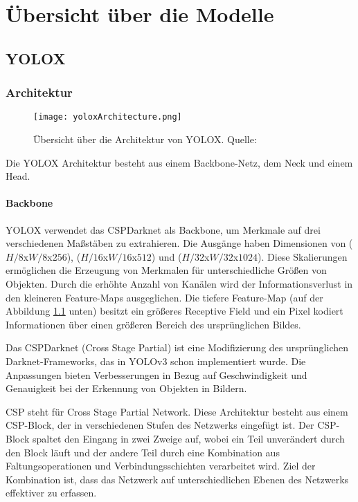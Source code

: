 \chapter{Übersicht über die Modelle}
\section{YOLOX}\label{chap:yolox}
\subsection{Architektur}

\begin{figure}[h]
	\centering
	\texttt{[image: yoloxArchitecture.png]}
	\caption[Übersicht über die Architektur von YOLOX]{Übersicht über die Architektur von YOLOX. Quelle: \cite{yoloArchitecture, yoloxPaper, yoloxGitHubRepo}}
	\label{fig:yoloxArchitecture.png}
\end{figure}

Die YOLOX Architektur besteht aus einem Backbone-Netz, dem Neck und einem Head.

\subsubsection{Backbone}
YOLOX verwendet das CSPDarknet als Backbone, um Merkmale auf drei verschiedenen Maßstäben zu extrahieren. Die Ausgänge haben Dimensionen von ($H/8$x$W/8$x$256$), ($H/16$x$W/16$x$512$) und ($H/32$x$W/32$x$1024$). Diese Skalierungen ermöglichen die Erzeugung von Merkmalen für unterschiedliche Größen von Objekten. Durch die erhöhte Anzahl von Kanälen wird der Informationsverlust in den kleineren Feature-Maps ausgeglichen. Die tiefere Feature-Map (auf der Abbildung \ref{fig:yoloxArchitecture.png} unten) besitzt ein größeres Receptive Field und ein Pixel kodiert Informationen über einen größeren Bereich des ursprünglichen Bildes.

Das CSPDarknet (Cross Stage Partial) ist eine Modifizierung des ursprünglichen Darknet-Frameworks, das in YOLOv3 schon implementiert wurde. Die Anpassungen bieten Verbesserungen in Bezug auf Geschwindigkeit und Genauigkeit bei der Erkennung von Objekten in Bildern.

CSP steht für Cross Stage Partial Network. Diese Architektur besteht aus einem CSP-Block, der in verschiedenen Stufen des Netzwerks eingefügt ist. Der CSP-Block spaltet den Eingang in zwei Zweige auf, wobei ein Teil unverändert durch den Block läuft und der andere Teil durch eine Kombination aus Faltungsoperationen und Verbindungsschichten verarbeitet wird. Ziel der Kombination ist, dass das Netzwerk auf unterschiedlichen Ebenen des Netzwerks effektiver zu erfassen.

